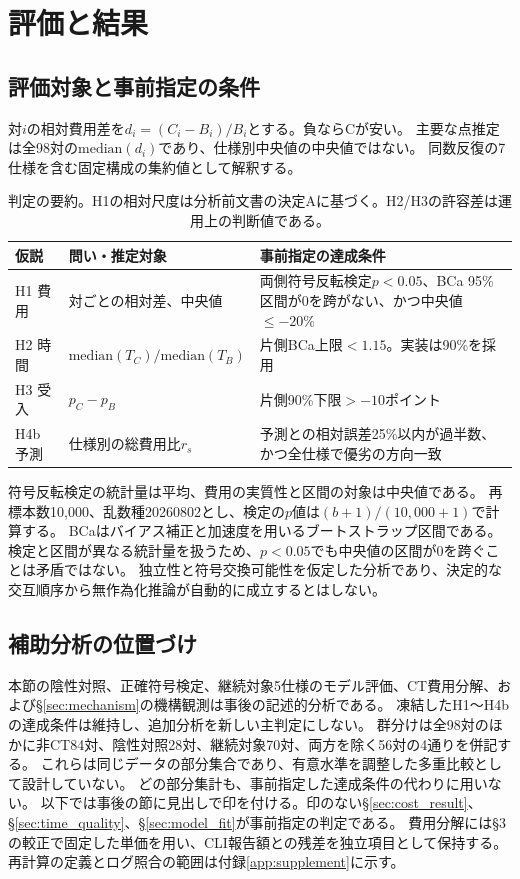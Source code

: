 \documentclass[a4paper,11pt]{article}
\begin{document}
\section{評価と結果}\label{sec:results}
\subsection{評価対象と事前指定の条件}
対$i$の相対費用差を$d_i=(C_i-B_i)/B_i$とする。負ならCが安い。
主要な点推定は全98対の$\mathrm{median}(d_i)$であり、仕様別中央値の中央値ではない。
同数反復の7仕様を含む固定構成の集約値として解釈する。

\begin{table}[!htbp]
\centering\small
\begin{tabularx}{\linewidth}{p{20mm}Y Y}
\toprule 仮説 & 問い・推定対象 & 事前指定の達成条件\\\midrule
H1 費用 & 対ごとの相対差、中央値 & 両側符号反転検定$p<0.05$、BCa 95\%区間が0を跨がない、かつ中央値$\leq-20$\%\\
H2 時間 & $\mathrm{median}(T_C)/\mathrm{median}(T_B)$ & 片側BCa上限$<1.15$。実装は90\%を採用\\
H3 受入 & $p_C-p_B$ & 片側90\%下限$>-10$ポイント\\
H4b 予測 & 仕様別の総費用比$r_s$ & 予測との相対誤差25\%以内が過半数、かつ全仕様で優劣の方向一致\\
\bottomrule
\end{tabularx}
\caption{判定の要約。H1の相対尺度は分析前文書の決定Aに基づく。H2/H3の許容差は運用上の判断値である。}
\end{table}

符号反転検定の統計量は平均、費用の実質性と区間の対象は中央値である。
再標本数10,000、乱数種20260802とし、検定の$p$値は$(b+1)/(10{,}000+1)$で計算する\cite{phipson}。
BCaはバイアス補正と加速度を用いるブートストラップ区間である\cite{bootstrap}。
検定と区間が異なる統計量を扱うため、$p<0.05$でも中央値の区間が0を跨ぐことは矛盾ではない。
独立性と符号交換可能性を仮定した分析であり、決定的な交互順序から無作為化推論が自動的に成立するとはしない。

\subsection{補助分析の位置づけ}
本節の陰性対照、正確符号検定、継続対象5仕様のモデル評価、CT費用分解、および\S\ref{sec:mechanism}の機構観測は事後の記述的分析である。
凍結したH1〜H4bの達成条件は維持し、追加分析を新しい主判定にしない。
群分けは全98対のほかに非CT84対、陰性対照28対、継続対象70対、両方を除く56対の4通りを併記する。
これらは同じデータの部分集合であり、有意水準を調整した多重比較として設計していない。
どの部分集計も、事前指定した達成条件の代わりに用いない。
以下では事後の節に見出しで印を付ける。印のない\S\ref{sec:cost_result}、\S\ref{sec:time_quality}、\S\ref{sec:model_fit}が事前指定の判定である。
費用分解には\S3の較正で固定した単価を用い、CLI報告額との残差を独立項目として保持する。
再計算の定義とログ照合の範囲は付録\ref{app:supplement}に示す。
\end{document}
